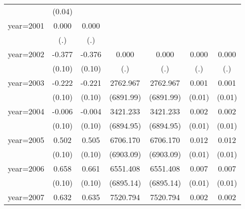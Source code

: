 {\begin{tabular}{l*{6}{c}}
                    &      (0.04)         &                     &                     &                     &                     &                     \\
year=2001           &       0.000         &       0.000         &                     &                     &                     &                     \\
                    &         (.)         &         (.)         &                     &                     &                     &                     \\
year=2002           &      -0.377\sym{***}&      -0.376\sym{***}&       0.000         &       0.000         &       0.000         &       0.000         \\
                    &      (0.10)         &      (0.10)         &         (.)         &         (.)         &         (.)         &         (.)         \\
year=2003           &      -0.222\sym{*}  &      -0.221\sym{*}  &    2762.967         &    2762.967         &       0.001         &       0.001         \\
                    &      (0.10)         &      (0.10)         &   (6891.99)         &   (6891.99)         &      (0.01)         &      (0.01)         \\
year=2004           &      -0.006         &      -0.004         &    3421.233         &    3421.233         &       0.002         &       0.002         \\
                    &      (0.10)         &      (0.10)         &   (6894.95)         &   (6894.95)         &      (0.01)         &      (0.01)         \\
year=2005           &       0.502\sym{***}&       0.505\sym{***}&    6706.170         &    6706.170         &       0.012         &       0.012         \\
                    &      (0.10)         &      (0.10)         &   (6903.09)         &   (6903.09)         &      (0.01)         &      (0.01)         \\
year=2006           &       0.658\sym{***}&       0.661\sym{***}&    6551.408         &    6551.408         &       0.007         &       0.007         \\
                    &      (0.10)         &      (0.10)         &   (6895.14)         &   (6895.14)         &      (0.01)         &      (0.01)         \\
year=2007           &       0.632\sym{***}&       0.635\sym{***}&    7520.794         &    7520.794         &       0.002         &       0.002         \\

\end{tabular}}
